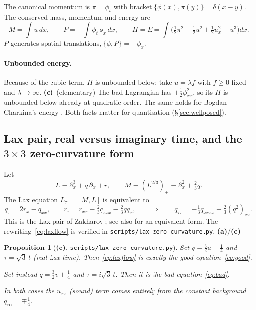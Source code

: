 \documentclass[11pt,a4paper]{article}
\newcommand{\La}{\textsf{\textbf{(a)}}}
\newcommand{\Lc}{\textsf{\textbf{(c)}}}
\newcommand{\script}[1]{\texttt{scripts/#1}}
\newtheorem{proposition}{Proposition}[section]
\theoremstyle{remark}
\begin{document}
The canonical momentum is $\pi=\phi_t$ with bracket $\{\phi(x),\pi(y)\}=\delta(x-y)$. The conserved mass, momentum and energy are
\begin{equation}\label{eq:EPM}
M=\int u\,dx,\qquad P=-\int \phi_t\,\phi_x\,dx,\qquad H=E=\int\Big(\tfrac12\pi^2+\tfrac12u^2+\tfrac12u_x^2-u^3\Big)dx .
\end{equation}
$P$ generates spatial translations, $\{\phi,P\}=-\phi_x$.

\paragraph{Unbounded energy.} Because of the cubic term, $H$ is unbounded below: take $u=\lambda f$ with $f\ge0$ fixed and $\lambda\to\infty$. \Lc\ (elementary) The bad Lagrangian has $+\tfrac12\phi_{xx}^2$, so its $H$ is unbounded below already at quadratic order. The same holds for Bogdan--Charkina's energy \cite[eq.\,(10)]{BC}. Both facts matter for quantisation (\S\ref{sec:wellposed}).

\subsection{Lax pair, real versus imaginary time, and the $3\times3$ zero-curvature form}\label{sec:lax}

Let
\[
L=\partial_x^3+q\,\partial_x+r,\qquad M=(L^{2/3})_+=\partial_x^2+\tfrac23 q .
\]
The Lax equation $L_\tau=[M,L]$ is equivalent to
\begin{equation}\label{eq:laxflow}
q_\tau=2r_x-q_{xx},\qquad r_\tau=r_{xx}-\tfrac23q_{xxx}-\tfrac23qq_x,
\qquad\Longrightarrow\qquad q_{\tau\tau}=-\tfrac13 q_{xxxx}-\tfrac23(q^2)_{xx}.
\end{equation}
This is the Lax pair of Zakharov \cite{Zak}; see also \cite[eqs.\,(1.7)--(1.8)]{CL-GB} for an equivalent form. The rewriting~\eqref{eq:laxflow} is verified in \script{lax\_zero\_curvature.py}. \La/\Lc

\begin{proposition}[\Lc, \script{lax\_zero\_curvature.py}]\label{prop:goodbad}
Set $q=\tfrac32u-\tfrac14$ and $\tau=\sqrt3\,t$ (real Lax time). Then~\eqref{eq:laxflow} is exactly the good equation~\eqref{eq:good}.

Set instead $q=\tfrac32v+\tfrac14$ and $\tau=i\sqrt3\,t$. Then it is the bad equation~\eqref{eq:bad}.

In both cases the $u_{xx}$ (sound) term comes entirely from the constant background $q_\infty=\mp\frac14$.
\end{proposition}
\end{document}
